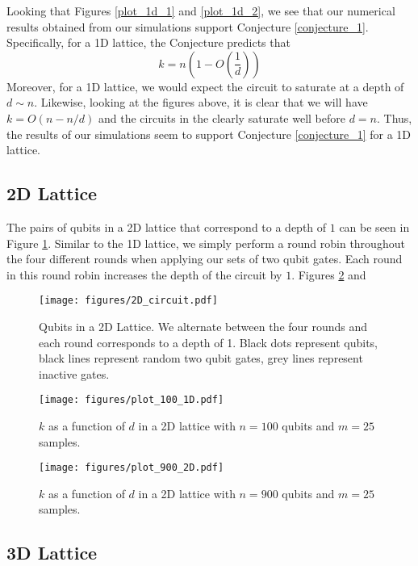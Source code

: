 \message{ !name(report_1.tex)}\documentclass[11pt]{article}
\theoremstyle{definition}
\theoremstyle{plain}
\begin{document}
Looking that Figures {\ref{plot_1d_1}} and {\ref{plot_1d_2}}, we see that our numerical results obtained from our simulations support Conjecture {\ref{conjecture_1}}. Specifically, for a 1D lattice, the Conjecture predicts that
\begin{equation}
k = n \left( 1 - O\left(\frac{1}{d} \right) \right) 
\end{equation}
Moreover, for a 1D lattice, we would expect the circuit to saturate at a depth of $d \sim n$. Likewise, looking at the figures above, it is clear that we will have $k = O(n - n/d)$ and the circuits in the clearly saturate well before $d = n$. Thus, the results of our simulations seem to support Conjecture {\ref{conjecture_1}} for a 1D lattice. 

\subsection{2D Lattice}
The pairs of qubits in a 2D lattice that correspond to a depth of $1$ can be seen in Figure {\ref{fig_2d}}. Similar to the 1D lattice, we simply perform a round robin throughout the four different rounds when applying our sets of two qubit gates. Each round in this round robin increases the depth of the circuit by $1$. Figures {\ref{plot_2d_1}} and 

\begin{figure}[!htp]
\centering
\texttt{[image: figures/2D\_circuit.pdf]}
\caption{Qubits in a 2D Lattice. We alternate between the four rounds and each round corresponds to a depth of 1. Black dots represent qubits, black lines represent random two qubit gates, grey lines represent inactive gates. }
\label{fig_2d}
\end{figure}

\begin{figure}[!htp]
\centering
\texttt{[image: figures/plot\_100\_1D.pdf]}
\caption{$k$ as a function of $d$ in a 2D lattice with $n = 100$ qubits and $m = 25$ samples.}
\label{plot_2d_1}
\end{figure}

\begin{figure}[!htp]
\centering
\texttt{[image: figures/plot\_900\_2D.pdf]}
\caption{$k$ as a function of $d$ in a 2D lattice with $n = 900$ qubits and $m =25$ samples.}
\label{plot_2d_2} 
\end{figure}  


\clearpage 

\subsection{3D Lattice}
\end{document}
